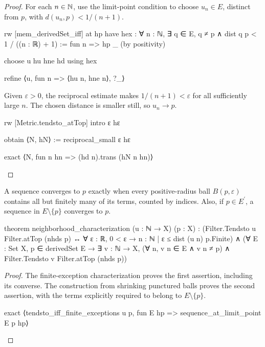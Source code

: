 \begin{proof}
  For each $n\in\mathbb{N}$, use the limit-point condition to choose $u_n\in E$, distinct from $p$, with
  $d(u_n,p)<1/(n+1)$.

  \begin{lean}
    rw [mem_derivedSet_iff] at hp
    have hex : ∀ n : ℕ, ∃ q ∈ E, q ≠ p ∧ dist q p < 1 / ((n : ℝ) + 1) :=
      fun n => hp _ (by positivity)

    choose u hu hne hd using hex

    refine ⟨u, fun n => ⟨hu n, hne n⟩, ?_⟩
  \end{lean}

  Given $\varepsilon>0$, the reciprocal estimate makes $1/(n+1)<\varepsilon$ for all sufficiently
  large $n$.
  The chosen distance is smaller still, so $u_n\to p$.

  \begin{lean}
    rw [Metric.tendsto_atTop]
    intro ε hε

    obtain ⟨N, hN⟩ := reciprocal_small ε hε

    exact ⟨N, fun n hn => (hd n).trans (hN n hn)⟩
  \end{lean}

\end{proof}

\begin{theorem}
  \label{ma:thm:neighborhood}
  A sequence converges to $p$ exactly when every positive-radius ball $B(p,\varepsilon)$ contains
  all but finitely many of its terms, counted by indices.
  Also, if $p\in E^{\prime}$, a sequence in $E\setminus\{p\}$ converges to $p$.

  \begin{lean}
    theorem neighborhood_characterization (u : ℕ → X) (p : X) :
        (Filter.Tendsto u Filter.atTop (nhds p) ↔ ∀ ε : ℝ, 0 < ε → {n : ℕ | ε ≤ dist (u n) p}.Finite) ∧
        (∀ E : Set X, p ∈ derivedSet E →
          ∃ v : ℕ → X, (∀ n, v n ∈ E ∧ v n ≠ p) ∧ Filter.Tendsto v Filter.atTop (nhds p))
  \end{lean}
\end{theorem}

\begin{proof}
  The finite-exception characterization proves the first assertion, including its converse.
  The construction from shrinking punctured balls proves the second assertion, with the terms
  explicitly required to belong to $E\setminus\{p\}$.

  \begin{lean}
    exact ⟨tendsto_iff_finite_exceptions u p, fun E hp => sequence_at_limit_point E p hp⟩
  \end{lean}

\end{proof}
